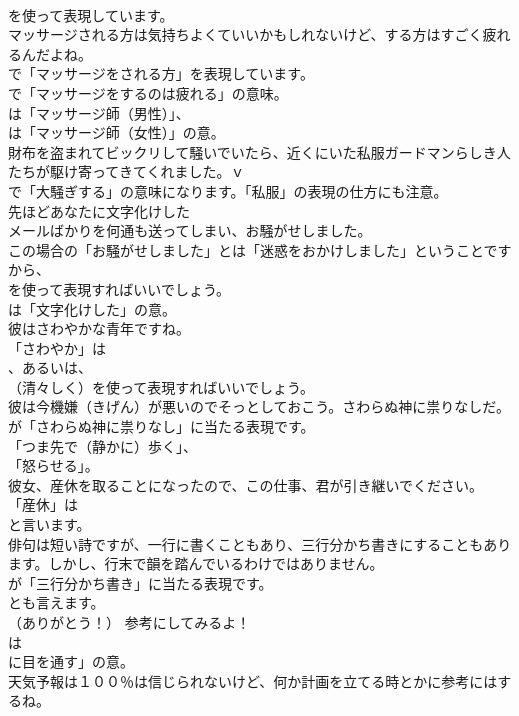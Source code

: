 \documentclass[8pt]{extreport}
\begin{document}
\begin{CJK}{UTF8}{min}
\\	を使って表現しています。	
\\	マッサージされる方は気持ちよくていいかもしれないけど、する方はすごく疲れるんだよね。 
\\	で「マッサージをされる方」を表現しています。
\\	で「マッサージをするのは疲れる」の意味。
\\	は「マッサージ師（男性）」、
\\	は「マッサージ師（女性）」の意。	
\\	財布を盗まれてビックリして騒いでいたら、近くにいた私服ガードマンらしき人たちが駆け寄ってきてくれました。ｖ 
\\	で「大騒ぎする」の意味になります。「私服」の表現の仕方にも注意。	
\\	先ほどあなたに文字化けした
\\	メールばかりを何通も送ってしまい、お騒がせしました。 
\\	この場合の「お騒がせしました」とは「迷惑をおかけしました」ということですから、
\\	を使って表現すればいいでしょう。
\\	は「文字化けした」の意。	
\\	彼はさわやかな青年ですね。 
\\	「さわやか」は 
\\	、あるいは、
\\	（清々しく）を使って表現すればいいでしょう。	
\\	彼は今機嫌（きげん）が悪いのでそっとしておこう。さわらぬ神に祟りなしだ。 
\\	が「さわらぬ神に祟りなし」に当たる表現です。
\\	「つま先で（静かに）歩く」、
\\	「怒らせる」。	
\\	彼女、産休を取ることになったので、この仕事、君が引き継いでください。 
\\	「産休」は
\\	と言います。	
\\	俳句は短い詩ですが、一行に書くこともあり、三行分かち書きにすることもあります。しかし、行末で韻を踏んでいるわけではありません。 
\\	が「三行分かち書き」に当たる表現です。
\\	とも言えます。	
\\	（ありがとう！） 参考にしてみるよ！ 
\\	は
\\	に目を通す」の意。	
\\	天気予報は１００％は信じられないけど、何か計画を立てる時とかに参考にはするね。 

\end{CJK}
\end{document}
